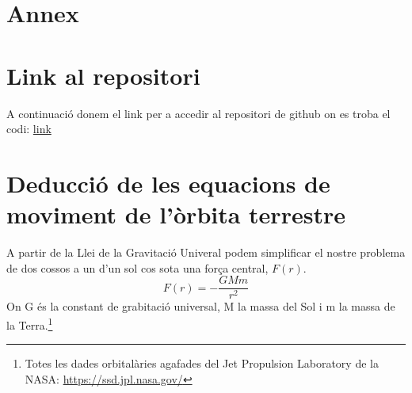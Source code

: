 \documentclass[11pt]{article}
\begin{document}
\section*{Annex}
\appendix

\section{Link al repositori}
\vspace{-1em}
A continuació donem el link per a accedir al repositori de github on es troba el codi: \href{https://github.com/isaacbg25/Sol/tree/main}{link}


\section{Deducció de les equacions de moviment de l'òrbita terrestre}
\label{annex: equ_mov}
A partir de la Llei de la Gravitació Univeral podem simplificar el nostre problema de dos cossos a un d'un sol cos sota una força central, $F(r)$.
\begin{equation}
    F(r)=-\frac{GMm}{r^2}
\end{equation}
On G és la constant de grabitació universal, M la massa del Sol i m la massa de la Terra.\footnote{Totes les dades orbitalàries agafades del Jet Propulsion Laboratory de la NASA: \url{https://ssd.jpl.nasa.gov/}}
\end{document}
